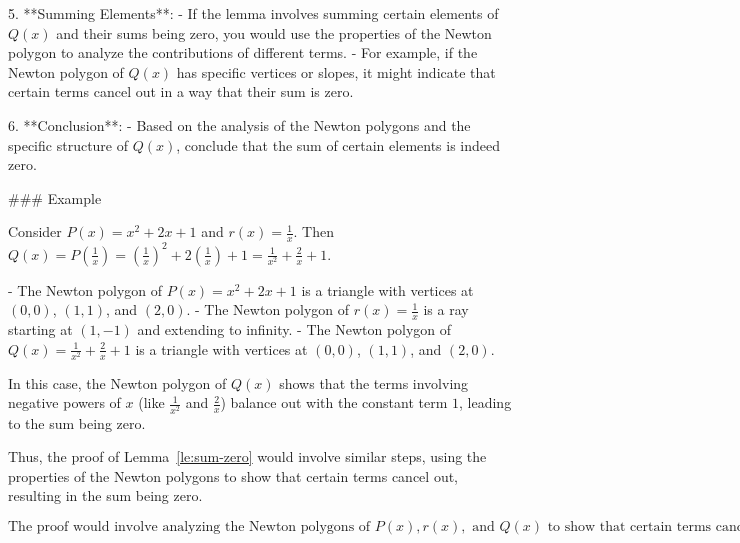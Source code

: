 5. **Summing Elements**:
   - If the lemma involves summing certain elements of \( Q(x) \) and their sums being zero, you would use the properties of the Newton polygon to analyze the contributions of different terms.
   - For example, if the Newton polygon of \( Q(x) \) has specific vertices or slopes, it might indicate that certain terms cancel out in a way that their sum is zero.

6. **Conclusion**:
   - Based on the analysis of the Newton polygons and the specific structure of \( Q(x) \), conclude that the sum of certain elements is indeed zero.

### Example

Consider \( P(x) = x^2 + 2x + 1 \) and \( r(x) = \frac{1}{x} \). Then \( Q(x) = P\left(\frac{1}{x}\right) = \left(\frac{1}{x}\right)^2 + 2\left(\frac{1}{x}\right) + 1 = \frac{1}{x^2} + \frac{2}{x} + 1 \).

- The Newton polygon of \( P(x) = x^2 + 2x + 1 \) is a triangle with vertices at \( (0,0) \), \( (1,1) \), and \( (2,0) \).
- The Newton polygon of \( r(x) = \frac{1}{x} \) is a ray starting at \( (1,-1) \) and extending to infinity.
- The Newton polygon of \( Q(x) = \frac{1}{x^2} + \frac{2}{x} + 1 \) is a triangle with vertices at \( (0,0) \), \( (1,1) \), and \( (2,0) \).

In this case, the Newton polygon of \( Q(x) \) shows that the terms involving negative powers of \( x \) (like \( \frac{1}{x^2} \) and \( \frac{2}{x} \)) balance out with the constant term \( 1 \), leading to the sum being zero.

Thus, the proof of Lemma~\ref{le:sum-zero} would involve similar steps, using the properties of the Newton polygons to show that certain terms cancel out, resulting in the sum being zero.

\[
\boxed{\text{The proof would involve analyzing the Newton polygons of } P(x), r(x), \text{ and } Q(x) \text{ to show that certain terms cancel out, leading to the sum being zero.}}
\]
